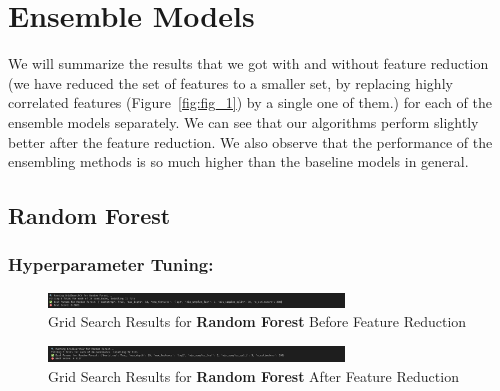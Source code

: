 \documentclass[a4paper,12pt]{article}
\begin{document}
\section{Ensemble Models}
We will summarize the results that we got with and without feature reduction (we have reduced the set of features to a smaller set, by replacing highly correlated features (Figure~\ref{fig:fig_1}) by a single one of them.) for each of the ensemble models separately.
We can see that our algorithms perform slightly better after the feature reduction. We also observe that the performance of the ensembling methods is so much higher than the baseline models in general. 

\subsection{Random Forest}
\subsubsection{Hyperparameter Tuning:}
\begin{figure}[H]
    \centering
    \includegraphics[width=0.7\textwidth]{./images/gsrf1.png}
    \caption{Grid Search Results for \textbf{Random Forest} Before Feature Reduction}
    \label{fig:fig_15}
\end{figure}
\begin{figure}[H]
    \centering
    \includegraphics[width=0.7\textwidth]{./images/gsrf2.png}
    \caption{Grid Search Results for \textbf{Random Forest} After Feature Reduction}
    \label{fig:fig_16}
\end{figure}
\end{document}
